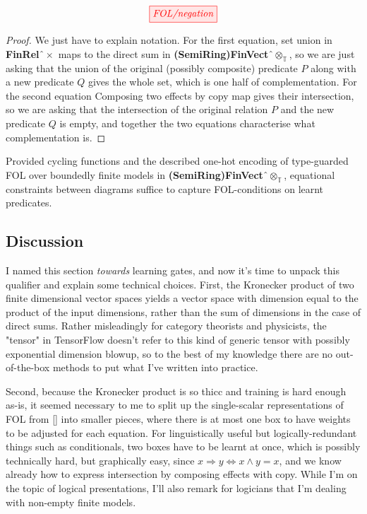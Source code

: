 \begin{fullwidth}
\begin{proposition}
\[\tikzfig{FOL/negation}\]
\begin{proof}
We just have to explain notation. For the first equation, set union in \textbf{FinRel}$ˆ{\times}$ maps to the direct sum in \textbf{(SemiRing)FinVect}$ˆ{\otimes}_\mathbb{T}$, so we are just asking that the union of the original (possibly composite) predicate $P$ along with a new predicate $Q$ gives the whole set, which is one half of complementation. For the second equation Composing two effects by copy map gives their intersection, so we are asking that the intersection of the original relation $P$ and the new predicate $Q$ is empty, and together the two equations characterise what complementation is.
\end{proof}
\end{proposition}

\begin{corollary}
Provided cycling functions and the described one-hot encoding of type-guarded FOL over boundedly finite models in \textbf{(SemiRing)FinVect}$ˆ{\otimes}_\mathbb{T}$, equational constraints between diagrams suffice to capture FOL-conditions on learnt predicates.
\end{corollary}

\subsection{Discussion}

I named this section \emph{towards} learning gates, and now it's time to unpack this qualifier and explain some technical choices. First, the Kronecker product of two finite dimensional vector spaces yields a vector space with dimension equal to the product of the input dimensions, rather than the sum of dimensions in the case of direct sums. Rather misleadingly for category theorists and physicists, the "tensor" in TensorFlow doesn't refer to this kind of generic tensor with possibly exponential dimension blowup, so to the best of my knowledge there are no out-of-the-box methods to put what I've written into practice.

Second, because the Kronecker product is so thicc and training is hard enough as-is, it seemed necessary to me to split up the single-scalar representations of FOL from [] into smaller pieces, where there is at most one box to have weights to be adjusted for each equation. For linguistically useful but logically-redundant things such as conditionals, two boxes have to be learnt at once, which is possibly technically hard, but graphically easy, since $x \Rightarrow y \iff x \wedge y = x$, and we know already how to express intersection by composing effects with copy. While I'm on the topic of logical presentations, I'll also remark for logicians that I'm dealing with non-empty finite models.


\end{fullwidth}
